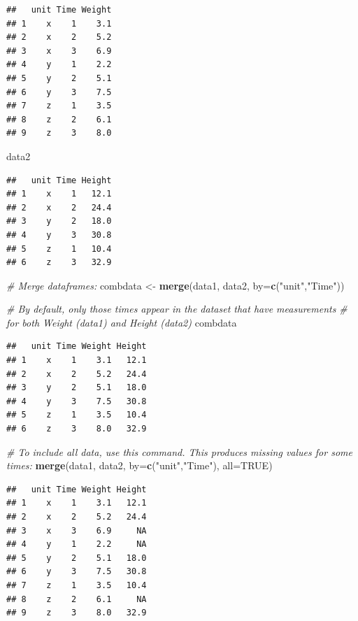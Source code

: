 \documentclass[]{book}
\newenvironment{Shaded}{\begin{snugshade}}{\end{snugshade}}
\newcommand{\CommentTok}[1]{\textcolor[rgb]{0.56,0.35,0.01}{\textit{#1}}}
\newcommand{\DataTypeTok}[1]{\textcolor[rgb]{0.13,0.29,0.53}{#1}}
\newcommand{\KeywordTok}[1]{\textcolor[rgb]{0.13,0.29,0.53}{\textbf{#1}}}
\newcommand{\NormalTok}[1]{#1}
\newcommand{\OtherTok}[1]{\textcolor[rgb]{0.56,0.35,0.01}{#1}}
\newcommand{\StringTok}[1]{\textcolor[rgb]{0.31,0.60,0.02}{#1}}
\begin{document}
\begin{verbatim}
##   unit Time Weight
## 1    x    1    3.1
## 2    x    2    5.2
## 3    x    3    6.9
## 4    y    1    2.2
## 5    y    2    5.1
## 6    y    3    7.5
## 7    z    1    3.5
## 8    z    2    6.1
## 9    z    3    8.0
\end{verbatim}

\begin{Shaded}
\begin{Highlighting}[]
\NormalTok{data2}
\end{Highlighting}
\end{Shaded}

\begin{verbatim}
##   unit Time Height
## 1    x    1   12.1
## 2    x    2   24.4
## 3    y    2   18.0
## 4    y    3   30.8
## 5    z    1   10.4
## 6    z    3   32.9
\end{verbatim}

\begin{Shaded}
\begin{Highlighting}[]
\CommentTok{# Merge dataframes:}
\NormalTok{combdata <-}\StringTok{ }\KeywordTok{merge}\NormalTok{(data1, data2, }\DataTypeTok{by=}\KeywordTok{c}\NormalTok{(}\StringTok{"unit"}\NormalTok{,}\StringTok{"Time"}\NormalTok{))}

\CommentTok{# By default, only those times appear in the dataset that have measurements}
\CommentTok{# for both Weight (data1) and Height (data2)}
\NormalTok{combdata}
\end{Highlighting}
\end{Shaded}

\begin{verbatim}
##   unit Time Weight Height
## 1    x    1    3.1   12.1
## 2    x    2    5.2   24.4
## 3    y    2    5.1   18.0
## 4    y    3    7.5   30.8
## 5    z    1    3.5   10.4
## 6    z    3    8.0   32.9
\end{verbatim}

\begin{Shaded}
\begin{Highlighting}[]
\CommentTok{# To include all data, use this command. This produces missing values for some times:}
\KeywordTok{merge}\NormalTok{(data1, data2, }\DataTypeTok{by=}\KeywordTok{c}\NormalTok{(}\StringTok{"unit"}\NormalTok{,}\StringTok{"Time"}\NormalTok{), }\DataTypeTok{all=}\OtherTok{TRUE}\NormalTok{)}
\end{Highlighting}
\end{Shaded}

\begin{verbatim}
##   unit Time Weight Height
## 1    x    1    3.1   12.1
## 2    x    2    5.2   24.4
## 3    x    3    6.9     NA
## 4    y    1    2.2     NA
## 5    y    2    5.1   18.0
## 6    y    3    7.5   30.8
## 7    z    1    3.5   10.4
## 8    z    2    6.1     NA
## 9    z    3    8.0   32.9
\end{verbatim}
\end{document}
